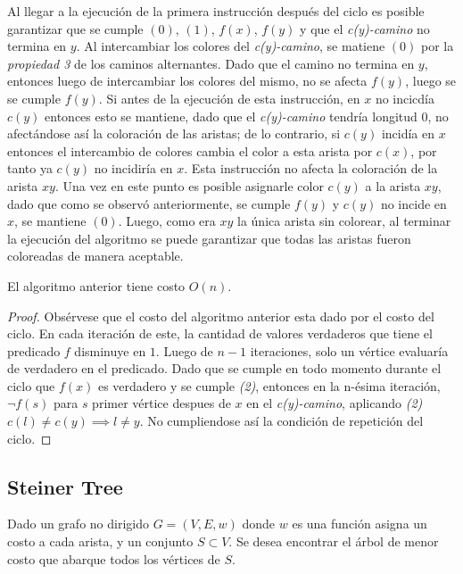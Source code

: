 \documentclass[../np-approximations.tex]{subfiles}
\begin{document}
Al llegar a la ejecución de la primera instrucción después del ciclo
es posible garantizar que se cumple $(0)$, $(1)$, $f(x)$, $f(y)$ y que el
\emph{c(y)-camino} no termina en $y$. Al intercambiar los colores del
\emph{c(y)-camino}, se matiene $(0)$ por la \emph{propiedad 3} de los caminos 
alternantes. Dado que el camino no termina en $y$, entonces luego de intercambiar 
los colores del mismo, no se afecta $f(y)$, luego se se cumple $f(y)$. Si antes de 
la ejecución de esta instrucción, en $x$ no incicdía $c(y)$ entonces esto se 
mantiene, dado que el \emph{c(y)-camino} tendría longitud 0, no afectándose así la 
coloración de las aristas; de lo contrario, si $c(y)$ incidía en $x$ entonces el 
intercambio de colores cambia el color a esta arista por $c(x)$, por tanto ya $c(y)$ 
no incidiría en $x$. Esta instrucción no afecta la coloración de la arista $xy$. Una 
vez en este punto es posible asignarle color $c(y)$ a la arista $xy$, dado que como 
se observó anteriormente, se cumple $f(y)$ y $c(y)$ no incide en $x$, se mantiene
$(0)$. Luego, como era $xy$ la única arista sin colorear, al terminar la ejecución 
del algoritmo se puede garantizar que todas las aristas fueron coloreadas de manera 
aceptable.

\begin{theorem}
	El algoritmo anterior tiene costo $O(n)$.
\end{theorem}

\begin{proof}
	Obsérvese que el costo del algoritmo anterior esta dado por el costo del ciclo.
	En cada iteración de este, la cantidad de valores verdaderos que tiene el predicado $f$ disminuye en $1$. Luego de $n-1$ iteraciones, solo un vértice
	evaluaría de verdadero en el predicado. Dado que se cumple en todo momento durante el ciclo que $f(x)$ es verdadero y se cumple \emph{(2)}, entonces en la n-ésima iteración, $\neg f(s)$ para $s$ primer vértice despues de $x$ en el \emph{c(y)-camino}, aplicando \emph{(2)} $c(l) \neq c(y) \implies l \neq y$. No cumpliendose así la condición de repetición del ciclo.
\end{proof}

\subsection{Steiner Tree}

\begin{statement}
	Dado un grafo no dirigido $G=(V,E,w)$ donde $w$ es una función
	asigna un costo a cada arista, y un conjunto $S\subset V$. Se desea encontrar el árbol de menor costo que abarque todos los vértices de $S$.
\end{statement}
\end{document}
